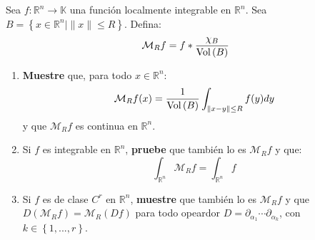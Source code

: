\documentclass[12pt]{report}
\theoremstyle{largebreak}
\newcommand\cf[3]{\ensuremath{#1:#2\rightarrow#3}}
\newcommand{\Vol}[1]{\ensuremath{\textup{Vol}\left(#1\right)}}
\begin{document}
    \begin{excer}
        Sea $\cf{f}{\mathbb{R}^n}{\mathbb{K}}$ una función localmente integrable en $\mathbb{R}^n$. Sea $B=\left\{x\in\mathbb{R}^n\Big|\|x\|\leq R \right\}$. Defina:
        \begin{equation*}
            \mathcal{M}_Rf=f*\frac{\chi_B}{\Vol{B}}
        \end{equation*}
        \begin{enumerate}
            \item \textbf{Muestre} que, para todo $x\in\mathbb{R}^n$:
            \begin{equation*}
                \mathcal{M}_Rf(x)=\frac{1}{\Vol{B}}\int_{\|x-y\|\leq R}f(y)dy
            \end{equation*}
            y que $\mathcal{M}_Rf$ es continua en $\mathbb{R}^n$.
            \item Si $f$ es integrable en $\mathbb{R}^n$, \textbf{pruebe} que también lo es $\mathcal{M}_Rf$ y que:
            \begin{equation*}
                \int_{\mathbb{R}^n}\mathcal{M}_Rf=\int_{\mathbb{R}^n}f
            \end{equation*}
            \item Si $f$ es de clase $C^r$ en $\mathbb{R}^n$, \textbf{muestre} que también lo es $\mathcal{M}_Rf$ y que $D(\mathcal{M}_Rf)=\mathcal{M}_R(Df)$ para todo opeardor $D=\partial_{\alpha_1}\cdots\partial_{\alpha_k}$, con $k\in\left\{1,...,r \right\}$.
        \end{enumerate}
    \end{excer}
\end{document}
